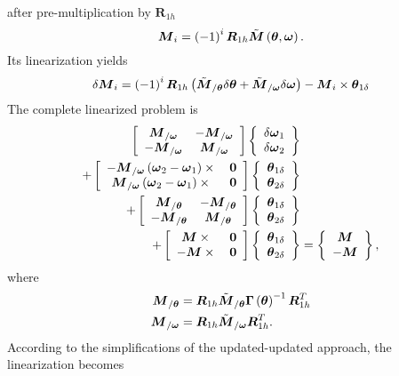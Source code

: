 \documentclass[10pt,dvips,fleqn]{report}
\newcommand{\T}[1]{\boldsymbol{#1}}
\begin{document}
after pre-multiplication by $\T{R}_{1h}$
\begin{equation}
	\T{M}_i = \plbr{-1}^i \T{R}_{1h} \tilde{\T{M}}\plbr{\T{\theta}, \T{\omega}} .
\end{equation}
Its linearization yields
\begin{equation}
	\delta\T{M}_i = \plbr{-1}^i \T{R}_{1h} \plbr{
		\tilde{\T{M}}_{/\T{\theta}} \delta \T{\theta}
		+ \tilde{\T{M}}_{/\T{\omega}} \delta\T{\omega}
	} - \T{M}_i \times \T{\theta}_{1\delta}
\end{equation}
The complete linearized problem is
\begin{align}
	\sqbr{\matr{cc}{
		\T{M}_{/\T{\omega}} & - \T{M}_{/\T{\omega}} \\
		- \T{M}_{/\T{\omega}} & \T{M}_{/\T{\omega}}
	}}\cubr{\cvvect{
		\delta\T{\omega}_1 \\
		\delta\T{\omega}_2
	}} & \nonumber \\
	+ \sqbr{\matr{cc}{
		- \T{M}_{/\T{\omega}} \plbr{\T{\omega}_2 - \T{\omega}_1}\times{} & \T{0} \\
		\T{M}_{/\T{\omega}} \plbr{\T{\omega}_2 - \T{\omega}_1}\times{} & \T{0}
	}} \cubr{\cvvect{
		\T{\theta}_{1\delta} \\
		\T{\theta}_{2\delta}
	}} & \nonumber \\
	+ \sqbr{\matr{cc}{
		\T{M}_{/\T{\theta}} & - \T{M}_{/\T{\theta}} \\
		- \T{M}_{/\T{\theta}} & \T{M}_{/\T{\theta}}
	}} \cubr{\cvvect{
		\T{\theta}_{1\delta} \\
		\T{\theta}_{2\delta}
	}} & \nonumber \\
	+ \sqbr{\matr{cc}{
		\T{M}\times{} & \T{0} \\
		- \T{M}\times{} & \T{0}
	}} \cubr{\cvvect{
		\T{\theta}_{1\delta} \\
		\T{\theta}_{2\delta}
	}} &= \cubr{\cvvect{
		\T{M} \\
		- \T{M}
	}} ,
\end{align}
where
\begin{align}
	\T{M}_{/\T{\theta}} &= \T{R}_{1h} \tilde{\T{M}}_{/\T{\theta}} \T{\Gamma}\plbr{\T{\theta}}^{-1} \T{R}_{1h}^T \\
	\T{M}_{/\T{\omega}} &= \T{R}_{1h} \tilde{\T{M}}_{/\T{\omega}} \T{R}_{1h}^T .
\end{align}
According to the simplifications of the updated-updated approach, the linearization becomes
\end{document}
